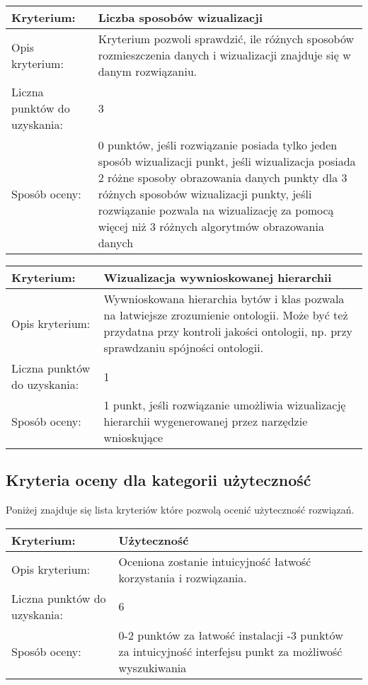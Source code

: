 \begin{longtable}{|m{3cm}|m{10cm}|}\hline
Kryterium:                   & \bf{ Liczba sposobów wizualizacji }\\ \hline
Opis kryterium:              &  Kryterium pozwoli sprawdzić,  ile różnych sposobów rozmieszczenia danych i wizualizacji znajduje się w danym rozwiązaniu. 
                               \\ \hline
Liczna punktów do uzyskania: &  3   \\ \hline
Sposób oceny:                &  0  punktów, jeśli rozwiązanie posiada tylko jeden sposób wizualizacji \newline	
                                1  punkt, jeśli wizualizacja posiada 2 różne sposoby obrazowania danych \newline
                                2  punkty dla 3 różnych sposobów wizualizacji \newline
                                3 punkty, jeśli rozwiązanie pozwala na wizualizację za pomocą więcej niż 3 różnych algorytmów obrazowania danych\\ \hline
\end{longtable}

\begin{longtable}{|m{3cm}|m{10cm}|}\hline
Kryterium:                   & \bf{ Wizualizacja wywnioskowanej hierarchii  }\\ \hline
Opis kryterium:              &  Wywnioskowana hierarchia bytów i klas pozwala na łatwiejsze zrozumienie ontologii. Może być też przydatna przy kontroli 
                                jakości ontologii, np. przy sprawdzaniu spójności ontologii.     \\ \hline
Liczna punktów do uzyskania: &  1   \\ \hline
Sposób oceny:                &  1 punkt, jeśli rozwiązanie umożliwia wizualizację hierarchii wygenerowanej przez narzędzie wnioskujące   \\ \hline
\end{longtable}


\subsection*{Kryteria oceny dla kategorii użyteczność}
Poniżej znajduje się lista kryteriów które pozwolą ocenić użyteczność rozwiązań. 

\begin{longtable}{|m{3cm}|m{10cm}|}\hline
Kryterium:                   & \bf{ Użyteczność  }\\ \hline
Opis kryterium:              &   Oceniona zostanie intuicyjność  łatwość  korzystania i rozwiązania. \\ \hline
Liczna punktów do uzyskania: &   6  \\ \hline
Sposób oceny:                &  0-2 punktów za łatwość instalacji \newline
                                0-3 punktów za intuicyjność interfejsu \newline
                                1 punkt za możliwość wyszukiwania  \\ \hline
\end{longtable}


